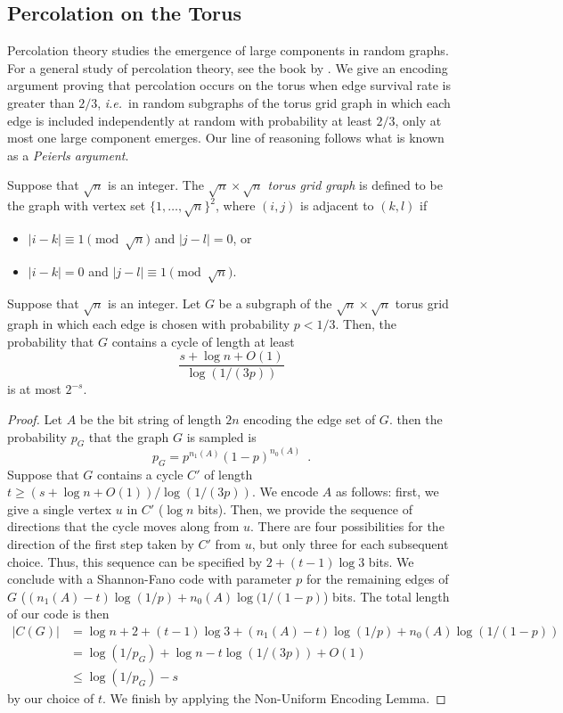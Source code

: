 \documentclass[format=acmsmall, review=false, screen=true]{acmart}
\begin{document}
\subsection{Percolation on the Torus}

Percolation theory studies the emergence of large components in random
graphs. For a general study of percolation theory, see the book by
.  We give an encoding argument
proving that percolation occurs on the torus when edge survival rate
is greater than $2/3$, \emph{i.e.}~in random subgraphs of the torus
grid graph in which each edge is included independently at random with
probability at least $2/3$, only at most one large component
emerges. Our line of reasoning follows what is known as a
\emph{Peierls argument}.

Suppose that $\sqrt{n}$ is an integer. The \emph{$\sqrt{n} \times \sqrt{n}$
  torus grid graph} is defined to be the graph with vertex set
$\{1, \ldots, \sqrt{n}\}^2$, where $(i, j)$ is adjacent to $(k, l)$
if
\begin{itemize}[topsep=0pt]
\item $|i - k| \equiv 1 \pmod{\sqrt{n}}$ and $|j - l| = 0$, or
\item $|i - k| = 0$ and $|j - l| \equiv 1 \pmod{\sqrt{n}}$.
\end{itemize}

\begin{thm}
  Suppose that $\sqrt{n}$ is an integer.  Let $G$ be a subgraph of the
  $\sqrt{n} \times \sqrt{n}$ torus grid graph in which each edge is
  chosen with probability $p < 1/3$. Then, the probability that $G$
  contains a cycle of length at least
  \[
    \frac{s + \log n + O(1)}{\log (1/(3p))}
  \]
  is at most $2^{-s}$.
\end{thm}
\begin{proof}
  Let $A$ be the bit string of length $2n$ encoding the edge set of
  $G$. then the probability $p_G$ that the graph $G$ is sampled is
  \[
     p_G  = p^{n_1(A)}(1-p)^{n_0(A)} \enspace .
  \]
  Suppose that $G$ contains a cycle $C'$ of length
  $t \geq (s + \log n + O(1))/\log (1/(3p))$. We encode $A$ as follows:
  first, we give a single vertex $u$ in $C'$ ($\log n$ bits). Then,
  we provide the sequence of directions that the cycle
  moves along from $u$. 
  There are four possibilities for the direction of the
  first step taken by $C'$ from $u$, but only three for each
  subsequent choice. Thus, this sequence can be specified by
  $2 + (t - 1) \log 3$ bits.
  We conclude with a Shannon-Fano code with parameter $p$ for
  the remaining edges of $G$ ($(n_1(A) - t) \log (1/p) + n_0(A) \log (1/(1 - p)$)
  bits. The total length of our code is then
  \begin{align*}
    |C(G)| &= \log n + 2 + (t - 1) \log 3 + (n_1(A) - t) \log (1/p) +
             n_0(A) \log (1/(1 - p)) \\
           &= \log (1/p_G) + \log n - t \log (1/(3p)) + O(1) \\
           &\leq \log (1/p_G) - s
  \end{align*}
  by our choice of $t$. We finish by applying the Non-Uniform Encoding
  Lemma.
\end{proof}
\end{document}
